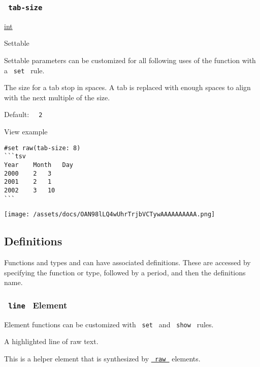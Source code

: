 \subsubsection{\texorpdfstring{\texttt{\ tab-size\ }}{ tab-size }}\label{parameters-tab-size}

\href{/docs/reference/foundations/int/}{int}

{{ Settable }}

\label{parameters-tab-size-settable-tooltip}
Settable parameters can be customized for all following uses of the
function with a \texttt{\ set\ } rule.

The size for a tab stop in spaces. A tab is replaced with enough spaces
to align with the next multiple of the size.

Default: \texttt{\ }{\texttt{\ 2\ }}\texttt{\ }


View example

\begin{verbatim}
#set raw(tab-size: 8)
```tsv
Year    Month   Day
2000    2   3
2001    2   1
2002    3   10
```
\end{verbatim}

\texttt{[image: /assets/docs/OAN98lLQ4wUhrTrjbVCTywAAAAAAAAAA.png]}

\subsection{\texorpdfstring{{ Definitions
}}{ Definitions }}\label{definitions}

\label{definitions-tooltip}
Functions and types and can have associated definitions. These are
accessed by specifying the function or type, followed by a period, and
then the definition\textquotesingle s name.

\subsubsection{\texorpdfstring{\texttt{\ line\ } {{ Element
}}}{ line   Element }}\label{definitions-line}

\label{definitions-line-element-tooltip}
Element functions can be customized with \texttt{\ set\ } and
\texttt{\ show\ } rules.

A highlighted line of raw text.

This is a helper element that is synthesized by
\href{/docs/reference/text/raw/}{\texttt{\ raw\ }} elements.

